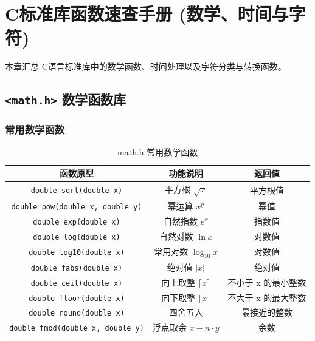 \clearpage
\begingroup
\let\clearpage\relax
\let\cleardoublepage\relax
\vspace*{\fill}
\chapter{C标准库函数速查手册 (数学、时间与字符)}
\begin{center}
本章汇总 C语言标准库中的数学函数、时间处理以及字符分类与转换函数。
\end{center}
\vspace*{\fill}
\endgroup
\clearpage


\section{\texorpdfstring{\texttt{<math.h>} 数学函数库}{<math.h> 数学函数库}}

\subsection{常用数学函数}

\begin{table}[H]
\centering
\small
\renewcommand{\arraystretch}{1.6}
\begin{tabulary}{\linewidth}{CCC}
\toprule
\textbf{函数原型} & \textbf{功能说明} & \textbf{返回值} \\ \midrule
\texttt{double sqrt(double x)} & 平方根 $\sqrt{x}$ & 平方根值 \\ 
\texttt{double pow(double x, double y)} & 幂运算 $x^y$ & 幂值 \\ 
\texttt{double exp(double x)} & 自然指数 $e^x$ & 指数值 \\ 
\texttt{double log(double x)} & 自然对数 $\ln x$ & 对数值 \\ 
\texttt{double log10(double x)} & 常用对数 $\log_{10} x$ & 对数值 \\ 
\texttt{double fabs(double x)} & 绝对值 $|x|$ & 绝对值 \\ 
\texttt{double ceil(double x)} & 向上取整 $\lceil x \rceil$ & 不小于 x 的最小整数 \\ 
\texttt{double floor(double x)} & 向下取整 $\lfloor x \rfloor$ & 不大于 x 的最大整数 \\ 
\texttt{double round(double x)} & 四舍五入 & 最接近的整数 \\ 
\texttt{double fmod(double x, double y)} & 浮点取余 $x - n \cdot y$ & 余数 \\ \bottomrule
\end{tabulary}
\caption{math.h 常用数学函数}
\label{tab:math_funcs}
\end{table}

